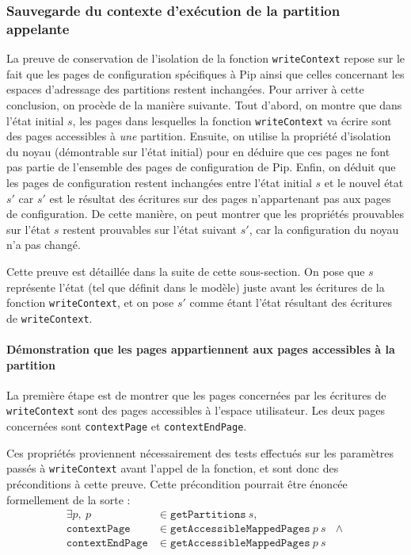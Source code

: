 			\subsubsection{Sauvegarde du contexte d'exécution de la partition appelante}

			La preuve de conservation de l'isolation de la fonction \texttt{writeContext} repose sur le fait que les pages de configuration spécifiques à Pip ainsi que celles concernant les espaces d'adressage des partitions restent inchangées. Pour arriver à cette conclusion, on procède de la manière suivante. Tout d'abord, on montre que dans l'état initial $s$, les pages dans lesquelles la fonction \texttt{writeContext} va écrire sont des pages accessibles à \emph{une} partition. Ensuite, on utilise la propriété d'isolation du noyau (démontrable sur l'état initial) pour en déduire que ces pages ne font pas partie de l'ensemble des pages de configuration de Pip. Enfin, on déduit que les pages de configuration restent inchangées entre l'état initial $s$ et le nouvel état $s'$ car $s'$ est le résultat des écritures sur des pages n'appartenant pas aux pages de configuration. De cette manière, on peut montrer que les propriétés prouvables sur l'état $s$ restent prouvables sur l'état suivant $s'$, car la configuration du noyau n'a pas changé.

			Cette preuve est détaillée dans la suite de cette sous-section. On pose que $s$ représente l'état (tel que définit dans le modèle) juste avant les écritures de la fonction \texttt{writeContext}, et on pose $s'$ comme étant l'état résultant des écritures de \texttt{writeContext}.

			\paragraph{Démonstration que les pages appartiennent aux pages accessibles à la partition}

			La première étape est de montrer que les pages concernées par les écritures de \texttt{writeContext} sont des pages accessibles à l'espace utilisateur. Les deux pages concernées sont \texttt{contextPage} et \texttt{contextEndPage}. 

			Ces propriétés proviennent nécessairement des tests effectués sur les paramètres passés à \texttt{writeContext} avant l'appel de la fonction, et sont donc des préconditions à cette preuve. Cette précondition pourrait être énoncée formellement de la sorte :\\
			\begin{align*}
				\exists p,~p &\in \mathtt{getPartitions}~s,\\
				\mathtt{contextPage} &\in \mathtt{getAccessibleMappedPages}~p~s~~~\wedge\\
				\mathtt{contextEndPage} &\in \mathtt{getAccessibleMappedPages}~p~s
			\end{align*}

